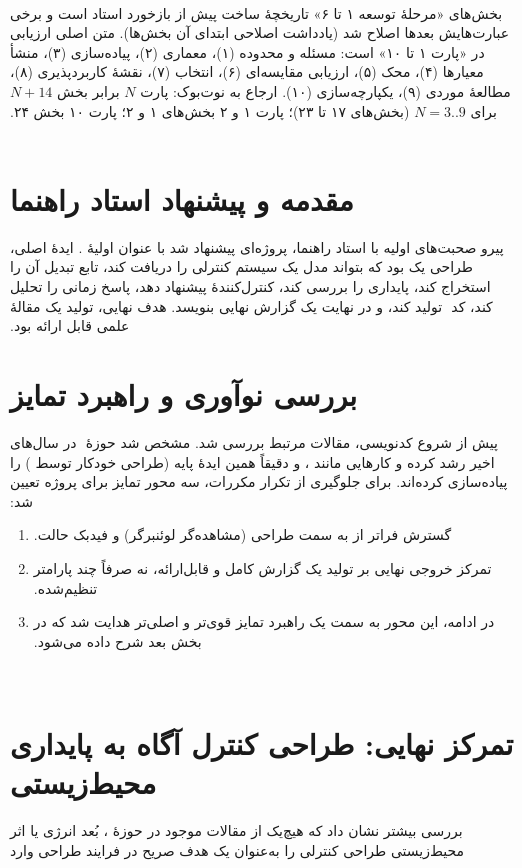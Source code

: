 ‫\documentclass[a4paper,12pt]{article}
\begin{document}
‫بخش‌های «مرحلهٔ توسعه ۱ تا ۶» تاریخچهٔ ساخت پیش از بازخورد استاد است و برخی عبارت‌هایش بعدها اصلاح شد (یادداشت اصلاحی ابتدای آن بخش‌ها). متن اصلی ارزیابی در «پارت ۱ تا ۱۰» است: مسئله و محدوده (۱)، معماری (۲)، پیاده‌سازی  (۳)، منشأ معیارها (۴)، محک (۵)، ارزیابی مقایسه‌ای (۶)، انتخاب  (۷)، نقشهٔ کاربردپذیری (۸)، مطالعهٔ موردی (۹)، یکپارچه‌سازی (۱۰). ارجاع به نوت‌بوک: پارت $N$ برابر بخش $N+14$ برای $N=3..9$ (بخش‌های ۱۷ تا ۲۳)؛ پارت ۱ و ۲ بخش‌های ۱ و ۲؛ پارت ۱۰ بخش ۲۴.
‫
‫
‫
‫\section{مقدمه و پیشنهاد استاد راهنما}
‫پیرو صحبت‌های اولیه با استاد راهنما، پروژه‌ای پیشنهاد شد با عنوان اولیهٔ
‫. ایدهٔ اصلی، طراحی یک  بود که بتواند مدل یک سیستم
‫کنترلی را دریافت کند، تابع تبدیل آن را استخراج کند، پایداری را بررسی
‫کند، کنترل‌کنندهٔ  پیشنهاد دهد، پاسخ زمانی را تحلیل کند، کد
‫ تولید کند، و در نهایت یک گزارش نهایی بنویسد. هدف نهایی،
‫تولید یک مقالهٔ علمی قابل ارائه بود.
‫
‫\section{بررسی نوآوری و راهبرد تمایز}
‫پیش از شروع کدنویسی، مقالات مرتبط بررسی شد. مشخص شد حوزهٔ
‫ در سال‌های اخیر رشد کرده و کارهایی مانند
‫،  و  دقیقاً همین
‫ایدهٔ پایه (طراحی خودکار  توسط ) را پیاده‌سازی
‫کرده‌اند. برای جلوگیری از تکرار مکررات، سه محور تمایز برای پروژه تعیین
‫شد:
‫\begin{enumerate}
‫\item گسترش فراتر از  به سمت طراحی  (مشاهده‌گر
‫لوئنبرگر) و فیدبک حالت.
‫\item تمرکز خروجی نهایی بر تولید یک گزارش کامل و قابل‌ارائه، نه صرفاً
‫چند پارامتر تنظیم‌شده.
‫\item در ادامه، این محور به سمت یک راهبرد تمایز قوی‌تر و اصلی‌تر
‫هدایت شد که در بخش بعد شرح داده می‌شود.
‫\end{enumerate}
‫
‫\section{تمرکز نهایی: طراحی کنترل آگاه به پایداری محیط‌زیستی}
‫بررسی بیشتر نشان داد که هیچ‌یک از مقالات موجود در حوزهٔ
‫، بُعد انرژی یا اثر
‫محیط‌زیستی طراحی کنترلی را به‌عنوان یک هدف صریح در فرایند طراحی وارد
\end{document}
